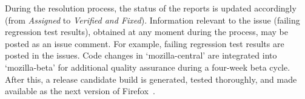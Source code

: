 During the resolution process, the status of the reports is updated accordingly (\eg from \textit{Assigned} to \textit{Verified and  Fixed}). 
Information relevant to the issue (\eg failing regression test results), obtained at any moment during the process, may be posted as an issue comment. For example, failing regression test results are posted in the issues. 
Code changes in `mozilla-central' are integrated into `mozilla-beta' for additional quality assurance during a four-week beta cycle. After this, a release candidate build is generated, tested thoroughly, and made available as the next version of Firefox~\cite{shipping-firefox}.












